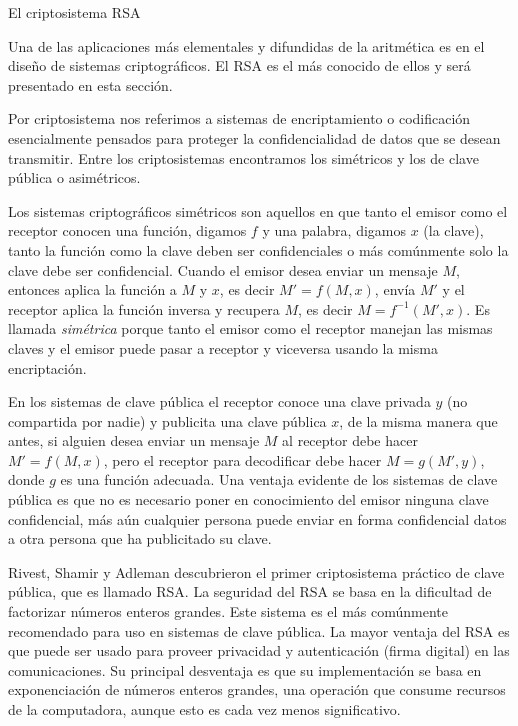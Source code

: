 \begin{section}{El criptosistema RSA}\label{seccion-el-criptosistema-rsa}


Una de las aplicaciones más elementales y difundidas de la aritmética es en el diseño de sistemas criptográficos. El RSA es el más conocido de ellos y será presentado en esta sección. 

Por criptosistema nos referimos a sistemas de encriptamiento o codificación esencialmente pensados para proteger la    confidencialidad de datos que
se desean transmitir. Entre los criptosistemas encontramos los simétricos  y los de clave pública o asimétricos.
  

Los sistemas criptográficos simétricos son aquellos en que tanto el emisor como el receptor conocen una función, digamos $f$ y una palabra, digamos $x$ (la clave), tanto la función como la clave 
deben ser confidenciales o más comúnmente solo la clave debe ser confidencial. Cuando el emisor desea enviar un mensaje $M$, entonces aplica la función a $M$ y $x$, es decir $M'=f(M,x)$,
envía $M'$ y el receptor aplica la función inversa y recupera $M$, es decir $M=f^{-1}(M',x)$. Es llamada \emph{simétrica} porque tanto el emisor como el receptor manejan las mismas claves y el emisor puede pasar a receptor y viceversa usando la misma encriptación.   

En los sistemas de clave pública el receptor conoce una clave privada $y$ (no compartida por nadie) y publicita una clave pública $x$, de la misma manera que antes,  si alguien desea enviar un mensaje $M$ al receptor debe hacer $M'=f(M,x)$, pero el receptor para decodificar debe hacer $M=g(M',y)$, donde $g$ es una función adecuada. Una ventaja evidente de los sistemas de clave pública es que no es necesario poner en conocimiento del emisor ninguna clave confidencial, más aún cualquier persona puede enviar en forma confidencial datos a otra persona que ha publicitado su clave.


Rivest, Shamir y Adleman descubrieron el primer criptosistema práctico de clave pública, que es llamado RSA. La seguridad del RSA se basa en la dificultad de factorizar números enteros grandes. Este sistema es el más comúnmente recomendado para uso en sistemas de clave pública. La mayor ventaja del RSA es que puede ser usado para proveer privacidad y autenticación (firma digital) en las comunicaciones. Su principal desventaja es que su implementación se basa en exponenciación de números enteros grandes, una operación que consume recursos de la computadora, aunque esto es cada vez menos significativo.



\end{section}
